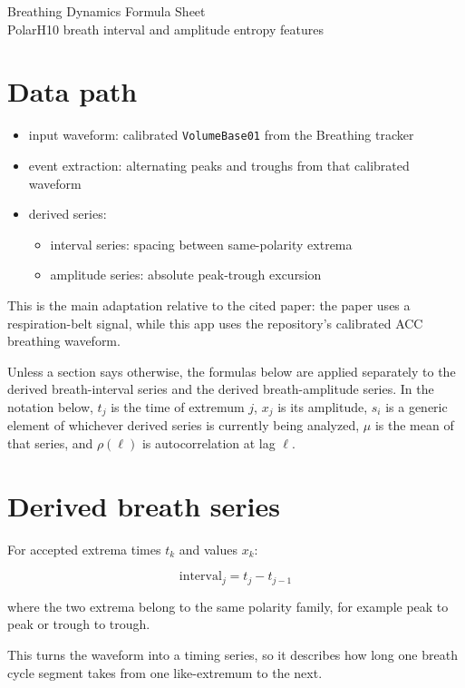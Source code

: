 \documentclass[11pt]{article}
\begin{document}
\begin{center}
{\LARGE Breathing Dynamics Formula Sheet}\\[0.5em]
{\large PolarH10 breath interval and amplitude entropy features}
\end{center}

\section*{Data path}

\begin{itemize}[leftmargin=1.5em]
\item input waveform: calibrated \texttt{VolumeBase01} from the Breathing tracker
\item event extraction: alternating peaks and troughs from that calibrated waveform
\item derived series:
  \begin{itemize}[leftmargin=1.5em]
  \item interval series: spacing between same-polarity extrema
  \item amplitude series: absolute peak-trough excursion
  \end{itemize}
\end{itemize}

This is the main adaptation relative to the cited paper: the paper uses a
respiration-belt signal, while this app uses the repository's calibrated ACC
breathing waveform.

Unless a section says otherwise, the formulas below are applied separately to
the derived breath-interval series and the derived breath-amplitude series. In
the notation below, $t_j$ is the time of extremum $j$, $x_j$ is its amplitude,
$s_i$ is a generic element of whichever derived series is currently being
analyzed, $\mu$ is the mean of that series, and $\rho(\ell)$ is
autocorrelation at lag $\ell$.

\section*{Derived breath series}

For accepted extrema times $t_k$ and values $x_k$:

\[
\text{interval}_j = t_j - t_{j-1}
\]

where the two extrema belong to the same polarity family, for example peak to
peak or trough to trough.

This turns the waveform into a timing series, so it describes how long one
breath cycle segment takes from one like-extremum to the next.
\end{document}

